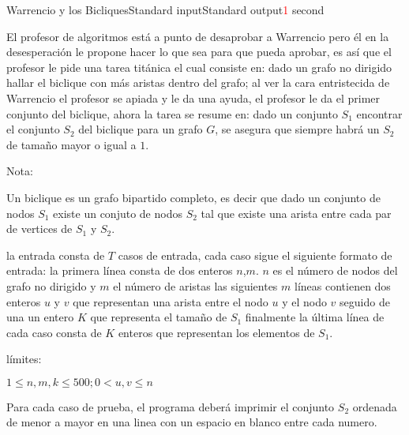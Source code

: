 \begin{problem}{Warrencio y los Bicliques}{Standard input}{Standard output}{\textcolor{red}{1} second}{}


El profesor de algoritmos está a punto de desaprobar a Warrencio pero él en la desesperación le propone hacer lo que sea para que pueda aprobar, es así que el profesor le pide una tarea titánica el cual consiste en: dado un grafo no dirigido hallar el biclique con más aristas dentro del grafo; al ver la cara entristecida de Warrencio el profesor se apiada  y le da una ayuda, el profesor le da el primer conjunto del biclique, ahora la tarea se resume en: dado un conjunto $S_1$ encontrar el conjunto $S_2$ del biclique para un grafo $G$, se asegura que siempre habrá un $S_2$ de tamaño mayor o igual a $1$. 

Nota:

Un biclique es un grafo bipartido completo, es decir que dado un conjunto de nodos $S_1$ existe un conjuto de nodos $S_2$ tal que existe una arista entre cada par de vertices de $S_1$ y $S_2$.

\InputFile
la entrada consta de $T$ casos de entrada, cada caso sigue el siguiente formato de entrada: 
la primera línea consta de dos  enteros $n$,$m$. $n$ es el número de nodos del grafo no dirigido y $m$ el número de aristas las siguientes $m$ líneas contienen dos enteros $u$ y $v$ que representan una arista entre el nodo $u$ y el nodo $v$ seguido de una un entero $K$ que representa el tamaño de $S_1$ finalmente la última línea de cada caso consta de $K$ enteros que representan los elementos de $S_1$. 

límites:

$1 \leq n,m,k \leq 500; 0 < u,v \leq n $ 

\OutputFile
Para cada caso de prueba, el programa deberá imprimir el conjunto $S_2$ ordenada de menor a mayor en una linea con un espacio en blanco entre cada numero.

\Example

\begin{example}
\end{example}

\end{problem}
